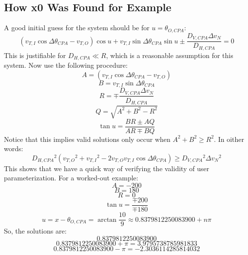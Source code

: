 \begin{theappendices}
\chapter{How x0 Was Found for Example}
\label{chap:x0}
A good initial guess for the system should be for \(u = \theta_{O,CPA} \):
\[ (v_{T,I}\cos{\Delta\theta_{CPA}}-v_{T,O})\cos{u}+v_{T,I}\sin{\Delta\theta_{CPA}}\sin{u}\pm\frac{D_{V,CPA}\Delta v_{N}}{D_{H,CPA}} = 0 \]
This is justifiable for \( D_{H,CPA}\ll R\), which is a reasonable assumption for this system.
Now use the following procedure:
\[A = (v_{T,I}\cos{\Delta\theta_{CPA}}-v_{T,O})\]
\[B = v_{T,I}\sin{\Delta\theta_{CPA}}\]
\[R = \mp \frac{D_{V,CPA}\Delta v_{N}}{D_{H,CPA}}\]
\[Q = \sqrt{A^2+B^2-R^2}\]
\[\tan{u} = \frac{BR \pm AQ}{AR \mp BQ}\]
Notice that this implies valid solutions only occur when \(A^2 + B^2 \geq R^2\). In oither words:
\[D_{H,CPA}{}^2(v_{T,O}{}^2+v_{T,I}{}^2-2v_{T,O}v_{T,I}\cos{\Delta\theta_{CPA}}) \geq D_{V,CPA}{}^2\Delta v_{N}{}^2\]
This shows that we have a quick way of verifying the validity of user parameterization.
For a worked-out example:
\[A = -200\]
\[B = 180\]
\[R = 0\]
\[\tan{u} = \frac{\mp 200}{\mp 180}\]
\[u = x - \theta_{O,CPA} = \arctan{\frac{10}{9}} \approx 0.8379812250083900 + n\pi\]
So, the solutions are:
\[0.8379812250083900\]
\[0.8379812250083900+\pi=3.9795738785981833\] 
\[0.8379812250083900-\pi=-2.3036114285814032\]
\end{theappendices}